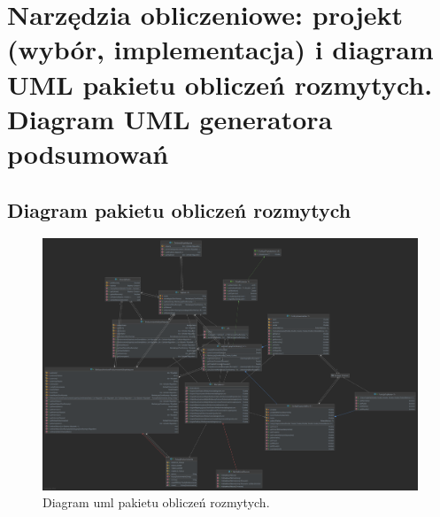 \documentclass{classrep}
\begin{document}
\section{Narzędzia obliczeniowe: projekt (wybór, implementacja) i diagram UML pakietu obliczeń rozmytych. Diagram UML generatora podsumowań}
\subsection{Diagram pakietu obliczeń rozmytych}

\begin{figure}[h!]
 \centering
 \includegraphics[width=14cm]{uml.png}
 \vspace{-0.3cm}
 \caption{Diagram uml pakietu obliczeń rozmytych. }
 \label{uml_obliczenia}
\end{figure}
\newpage
\end{document}
